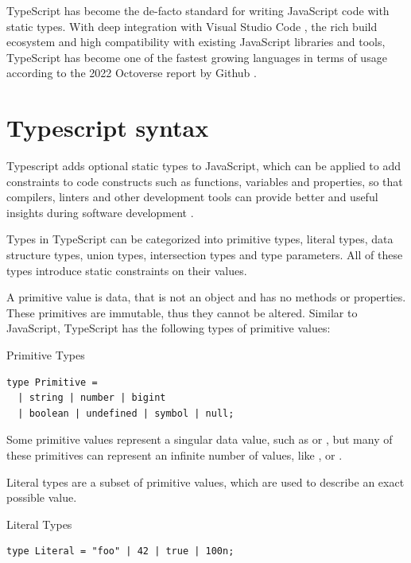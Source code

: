 TypeScript has become the de-facto standard for writing JavaScript code with static types. With deep integration with Visual Studio Code \cite{VisualStudioCode}, the rich build ecosystem and high compatibility with existing JavaScript libraries and tools, TypeScript has become one of the fastest growing languages in terms of usage according to the 2022 Octoverse report by Github \cite{Octoverse2022State}.

\section{Typescript syntax}

Typescript adds optional static types to JavaScript, which can be applied to add constraints to code constructs such as functions, variables and properties, so that compilers, linters and other development tools can provide better and useful insights during software development \cite{hejlsbergTypeScriptLanguageSpecification}.

Types in TypeScript can be categorized into primitive types, literal types, data structure types, union types, intersection types and type parameters. All of these types introduce static constraints on their values.

A primitive value is data, that is not an object and has no methods or properties. These primitives are immutable, thus they cannot be altered. Similar to JavaScript, TypeScript has the following types of primitive values:

\begin{listing}[h]
  \caption{Primitive Types}
  \begin{verbatim}
type Primitive = 
  | string | number | bigint
  | boolean | undefined | symbol | null;
\end{verbatim}
\end{listing}

Some primitive values represent a singular data value, such as  or , but many of these primitives can represent an infinite number of values, like ,  or .

Literal types are a subset of primitive values, which are used to describe an exact possible value.

\begin{listing}[h]
  \caption{Literal Types}
  \begin{verbatim}
type Literal = "foo" | 42 | true | 100n;
\end{verbatim}
\end{listing}

